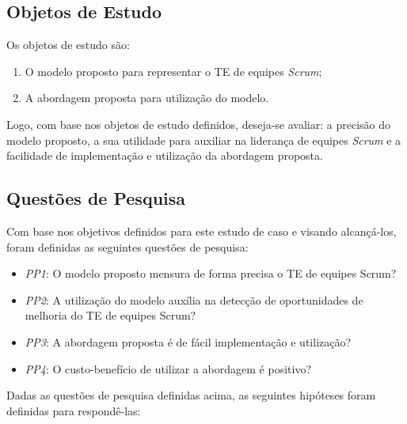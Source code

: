 \subsection{Objetos de Estudo}
\label{estudodecaso:design:objetos}

Os objetos de estudo são:

\begin{enumerate}
  \item O modelo proposto para representar o TE de equipes \textit{Scrum};
  \item A abordagem proposta para utilização do modelo.
\end{enumerate}

Logo, com base nos objetos de estudo definidos, deseja-se avaliar: a precisão do modelo proposto, a sua utilidade para auxiliar na liderança de equipes \textit{Scrum} e a facilidade de implementação e utilização da abordagem proposta.

\subsection{Questões de Pesquisa}
\label{estudodecaso:design:perguntas}

Com base nos objetivos definidos para este estudo de caso e visando alcançá-los, foram definidas as seguintes questões de pesquisa:

\begin{itemize}
  \item \textit{PP1}: O modelo proposto mensura de forma precisa o TE de equipes Scrum?
  \item \textit{PP2}: A utilização do modelo auxília na detecção de oportunidades de melhoria do TE de equipes Scrum?
  \item \textit{PP3}: A abordagem proposta é de fácil implementação e utilização?
  \item \textit{PP4}: O custo-benefício de utilizar a abordagem é positivo?
\end{itemize}

Dadas as questões de pesquisa definidas acima, as seguintes hipóteses foram definidas para respondê-las:


